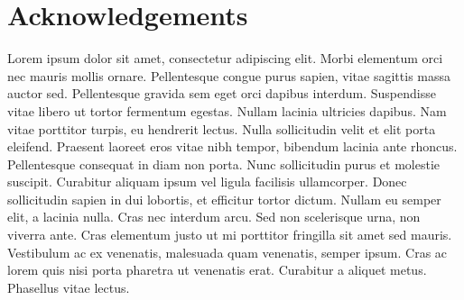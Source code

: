\documentclass[techmemo]{ecmwfrep}%
\begin{document}
\section*{Acknowledgements}
Lorem ipsum dolor sit amet, consectetur adipiscing elit. Morbi elementum orci nec mauris mollis ornare. Pellentesque congue purus sapien, vitae sagittis massa auctor sed. Pellentesque gravida sem eget orci dapibus interdum. Suspendisse vitae libero ut tortor fermentum egestas. Nullam lacinia ultricies dapibus. Nam vitae porttitor turpis, eu hendrerit lectus. Nulla sollicitudin velit et elit porta eleifend. Praesent laoreet eros vitae nibh tempor, bibendum lacinia ante rhoncus. Pellentesque consequat in diam non porta. Nunc sollicitudin purus et molestie suscipit. Curabitur aliquam ipsum vel ligula facilisis ullamcorper. Donec sollicitudin sapien in dui lobortis, et efficitur tortor dictum. Nullam eu semper elit, a lacinia nulla. Cras nec interdum arcu. Sed non scelerisque urna, non viverra ante. Cras elementum justo ut mi porttitor fringilla sit amet sed mauris. Vestibulum ac ex venenatis, malesuada quam venenatis, semper ipsum. Cras ac lorem quis nisi porta pharetra ut venenatis erat. Curabitur a aliquet metus. Phasellus vitae lectus.

 
\end{document}
